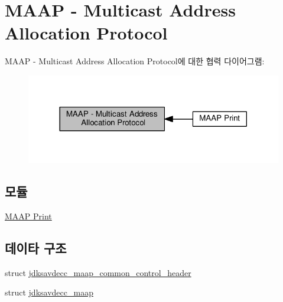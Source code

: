 \hypertarget{group__maap}{}\section{M\+A\+AP -\/ Multicast Address Allocation Protocol}
\label{group__maap}
M\+A\+AP -\/ Multicast Address Allocation Protocol에 대한 협력 다이어그램\+:
\nopagebreak
\begin{figure}[H]
\begin{center}
\leavevmode
\includegraphics[width=317pt]{group__maap}
\end{center}
\end{figure}
\subsection*{모듈}
\begin{DoxyCompactItemize}
\item 
\hyperlink{group__maap__print}{M\+A\+A\+P Print}
\end{DoxyCompactItemize}
\subsection*{데이타 구조}
\begin{DoxyCompactItemize}
\item 
struct \hyperlink{structjdksavdecc__maap__common__control__header}{jdksavdecc\+\_\+maap\+\_\+common\+\_\+control\+\_\+header}
\item 
struct \hyperlink{structjdksavdecc__maap}{jdksavdecc\+\_\+maap}
\end{DoxyCompactItemize}
